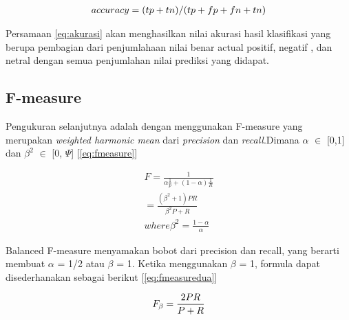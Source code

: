 \begin{equation}
\begin{split}
\tiny
accuracy = (tp+tn)/(tp+fp+fn+tn)
\label{eq:akurasi}
\normalsize
\end{split}
\end{equation}

Persamaan \ref{eq:akurasi} akan menghasilkan nilai akurasi hasil klasifikasi yang berupa pembagian dari penjumlahaan nilai benar actual positif, negatif , dan netral dengan semua penjumlahan nilai prediksi yang didapat.

\subsection*{F-measure}
Pengukuran selanjutnya adalah dengan menggunakan F-measure yang merupakan \textit{weighted harmonic mean} dari \textit{precision} dan \textit{recall}.Dimana $\alpha$ $\in$ [0,1] dan $\beta^2$ $\in$ [0, $\Psi$] [\ref{eq:fmeasure}]

\begin{equation}
\begin{split}
F = \frac{1}{\alpha \frac{1}{p} + (1 - \alpha)\frac{1}{R}} \\
= \frac{(\beta^2 + 1)PR}{\beta^2P + R} \\
where \beta^2 = \frac{1 - \alpha}{\alpha}
\label{eq:fmeasure}
\end{split}
\end{equation}


Balanced F-measure menyamakan bobot dari precision dan recall, yang berarti membuat $\alpha$ = 1/2 atau $\beta$ = 1. Ketika menggunakan $\beta$ = 1, formula dapat disederhanakan sebagai berikut  [\ref{eq:fmeasuredua}]

\begin{equation}
\begin{split}
\tiny
F_\beta = \frac{2PR}{P + R}
\label{eq:fmeasuredua}
\normalsize
\end{split}
\end{equation}
